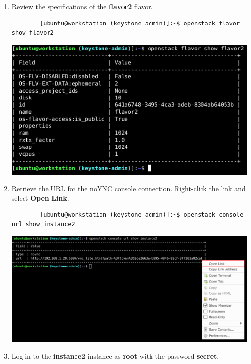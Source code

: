 \documentclass[letterpaper, 12pt]{article}
\begin{document}
\begin{enumerate}
    \item Review the specifications of the \textbf{flavor2} flavor.
    \begin{lstlisting}
        [ubuntu@workstation (keystone-admin)]:~$ openstack flavor show flavor2
    \end{lstlisting}

    \begin{center}
        \includegraphics[width=\linewidth]{images/part5/step4.png}
    \end{center}

    \item Retrieve the URL for the noVNC console connection.
    Right-click the link and select \textbf{Open Link}.
    \begin{lstlisting}
        [ubuntu@workstation (keystone-admin)]:~$ openstack console url show instance2
    \end{lstlisting}

    \begin{center}
        \includegraphics[width=\linewidth]{images/part5/step5.png}
    \end{center}

    \item Log in to the \textbf{instance2} instance as \textbf{root} with the password \textbf{secret}.


\end{enumerate}
\end{document}
